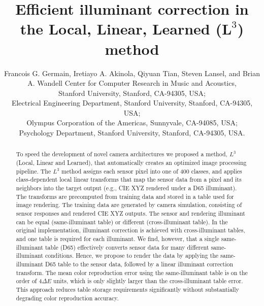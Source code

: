 \documentclass[]{spie}
\title{Efficient illuminant correction in the Local, Linear, Learned ({\LARGE$\boldsymbol L^3$}) method}
\author{Francois G. Germain\supit{a}, Iretiayo A. Akinola\supit{b}, Qiyuan Tian\supit{b}, Steven Lansel\supit{c}, and Brian A. Wandell\supit{b,d}
\skiplinehalf
\supit{a}Center for Computer Research in Music and Acoustics,\\ Stanford University, Stanford, CA-94305, USA;\\
\supit{b}Electrical Engineering Department, Stanford University, Stanford, CA-94305, USA;\\
\supit{c}Olympus Corporation of the Americas, Sunnyvale, CA-94085, USA;\\
\supit{d}Psychology Department, Stanford University, Stanford, CA-94305, USA.
}
\newcommand{\Lcube}{L^3}
\begin{document}
\maketitle

\begin{abstract}


To speed the development of novel camera architectures we proposed a method, $\Lcube$ (Local, Linear and Learned), that automatically creates an optimized image processing pipeline. The $\Lcube$ method assigns each sensor pixel into one of 400 classes, and applies class-dependent local linear transforms that map the sensor data from a pixel and its neighbors into the target output (e.g., CIE XYZ rendered under a D65 illuminant). The transforms are precomputed from training data and stored in a table used for image rendering. The training data are generated by camera simulation, consisting of sensor responses and rendered CIE XYZ outputs. The sensor and rendering illuminant can be equal (same-illuminant table) or different (cross-illuminant table). In the original implementation, illuminant correction is achieved with cross-illuminant tables, and one table is required for each illuminant. We find, however, that a single same-illuminant table (D65) effectively converts sensor data for many different same-illuminant conditions. Hence, we propose to render the data by applying the same-illuminant D65 table to the sensor data, followed by a linear illuminant correction transform. The mean color reproduction error using the same-illuminant table is on the order of 4$\Delta E$ units, which is only slightly larger than the cross-illuminant table error. This approach reduces table storage requirements significantly without substantially degrading color reproduction accuracy.


\end{abstract}
\end{document}
